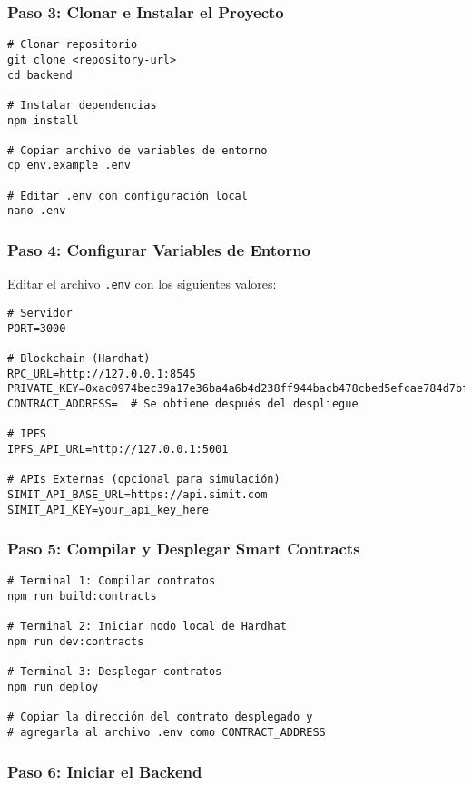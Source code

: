 \subsubsection{Paso 3: Clonar e Instalar el Proyecto}

\begin{verbatim}
# Clonar repositorio
git clone <repository-url>
cd backend

# Instalar dependencias
npm install

# Copiar archivo de variables de entorno
cp env.example .env

# Editar .env con configuración local
nano .env
\end{verbatim}

\subsubsection{Paso 4: Configurar Variables de Entorno}

Editar el archivo \texttt{.env} con los siguientes valores:

\begin{verbatim}
# Servidor
PORT=3000

# Blockchain (Hardhat)
RPC_URL=http://127.0.0.1:8545
PRIVATE_KEY=0xac0974bec39a17e36ba4a6b4d238ff944bacb478cbed5efcae784d7bf4f2ff80
CONTRACT_ADDRESS=  # Se obtiene después del despliegue

# IPFS
IPFS_API_URL=http://127.0.0.1:5001

# APIs Externas (opcional para simulación)
SIMIT_API_BASE_URL=https://api.simit.com
SIMIT_API_KEY=your_api_key_here
\end{verbatim}

\subsubsection{Paso 5: Compilar y Desplegar Smart Contracts}

\begin{verbatim}
# Terminal 1: Compilar contratos
npm run build:contracts

# Terminal 2: Iniciar nodo local de Hardhat
npm run dev:contracts

# Terminal 3: Desplegar contratos
npm run deploy

# Copiar la dirección del contrato desplegado y 
# agregarla al archivo .env como CONTRACT_ADDRESS
\end{verbatim}

\subsubsection{Paso 6: Iniciar el Backend}

